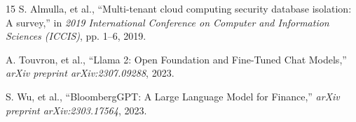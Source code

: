 \documentclass[11pt,journal,onecolumn]{article}
\begin{document}
\begin{thebibliography}{15}
S. Almulla, et al., ``Multi-tenant cloud computing security database isolation: A survey,'' in \textit{2019 International Conference on Computer and Information Sciences (ICCIS)}, pp. 1--6, 2019.

A. Touvron, et al., ``Llama 2: Open Foundation and Fine-Tuned Chat Models,'' \textit{arXiv preprint arXiv:2307.09288}, 2023.

S. Wu, et al., ``BloombergGPT: A Large Language Model for Finance,'' \textit{arXiv preprint arXiv:2303.17564}, 2023.
\end{thebibliography}
\end{document}
